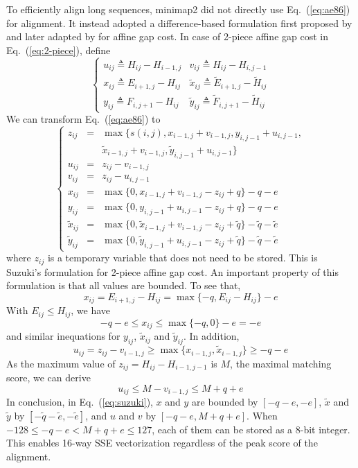 \documentclass{bioinfo}
\begin{document}
\begin{methods}
To efficiently align long sequences, minimap2 did not directly use
Eq.~(\ref{eq:ae86}) for alignment. It instead adopted a difference-based
formulation first proposed by \citet{Wu:1996aa} and later adapted by
\citet{Suzuki:2016} for affine gap cost. In case of 2-piece affine gap cost in
Eq.~(\ref{eq:2-piece}), define
\[
\left\{\begin{array}{ll}
u_{ij}\triangleq H_{ij}-H_{i-1,j} & v_{ij}\triangleq H_{ij}-H_{i,j-1} \\
x_{ij}\triangleq E_{i+1,j}-H_{ij} & \tilde{x}_{ij}\triangleq \tilde{E}_{i+1,j}-\tilde{H}_{ij} \\
y_{ij}\triangleq F_{i,j+1}-H_{ij} & \tilde{y}_{ij}\triangleq \tilde{F}_{i,j+1}-\tilde{H}_{ij}
\end{array}\right.
\]
We can transform Eq.~(\ref{eq:ae86}) to
\begin{equation}\label{eq:suzuki}
\left\{\begin{array}{lll}
z_{ij}&=&\max\{s(i,j),x_{i-1,j}+v_{i-1,j},y_{i,j-1}+u_{i,j-1},\\
&&\tilde{x}_{i-1,j}+v_{i-1,j},\tilde{y}_{i,j-1}+u_{i,j-1}\}\\
u_{ij}&=&z_{ij}-v_{i-1,j}\\
v_{ij}&=&z_{ij}-u_{i,j-1}\\
x_{ij}&=&\max\{0,x_{i-1,j}+v_{i-1,j}-z_{ij}+q\}-q-e\\
y_{ij}&=&\max\{0,y_{i,j-1}+u_{i,j-1}-z_{ij}+q\}-q-e\\
\tilde{x}_{ij}&=&\max\{0,\tilde{x}_{i-1,j}+v_{i-1,j}-z_{ij}+\tilde{q}\}-\tilde{q}-\tilde{e}\\
\tilde{y}_{ij}&=&\max\{0,\tilde{y}_{i,j-1}+u_{i,j-1}-z_{ij}+\tilde{q}\}-\tilde{q}-\tilde{e}
\end{array}\right.
\end{equation}
where $z_{ij}$ is a temporary variable that does not need to be stored.
This is Suzuki's formulation for 2-piece affine gap cost. An important property
of this formulation is that all values are bounded. To see that,
\[
x_{ij}=E_{i+1,j}-H_{ij}=\max\{-q,E_{ij}-H_{ij}\}-e
\]
With $E_{ij}\le H_{ij}$, we have
\[
-q-e\le x_{ij}\le\max\{-q,0\}-e=-e
\]
and similar inequations for $y_{ij}$, $\tilde{x}_{ij}$ and $\tilde{y}_{ij}$.
In addition,
\[
u_{ij}=z_{ij}-v_{i-1,j}\ge\max\{x_{i-1,j},\tilde{x}_{i-1,j}\}\ge-q-e
\]
As the maximum value of $z_{ij}=H_{ij}-H_{i-1,j-1}$ is $M$, the maximal
matching score, we can derive
\[
u_{ij}\le M-v_{i-1,j}\le M+q+e
\]
In conclusion, in Eq.~(\ref{eq:suzuki}), $x$ and $y$ are bounded by $[-q-e,-e]$,
$\tilde{x}$ and $\tilde{y}$ by $[-\tilde{q}-\tilde{e},-\tilde{e}]$, and $u$ and
$v$ by $[-q-e,M+q+e]$. When $-128\le-q-e<M+q+e\le127$, each of them can be stored as
a 8-bit integer. This enables 16-way SSE vectorization regardless of the peak
score of the alignment.


\end{methods}
\end{document}
